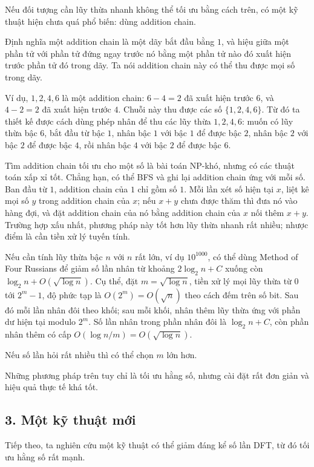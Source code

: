 \documentclass[11pt]{article}
\begin{document}
Nếu đối tượng cần lũy thừa nhanh không thể tối ưu bằng cách trên, có một kỹ
thuật hiện chưa quá phổ biến: dùng addition chain.

Định nghĩa một addition chain là một dãy bắt đầu bằng \(1\), và hiệu giữa một
phần tử với phần tử đứng ngay trước nó bằng một phần tử nào đó xuất hiện trước
phần tử đó trong dãy. Ta nói addition chain này có thể thu được mọi số trong
dãy.

Ví dụ, \(1,2,4,6\) là một addition chain: \(6-4=2\) đã xuất hiện trước \(6\),
và \(4-2=2\) đã xuất hiện trước \(4\). Chuỗi này thu được các số
\(\{1,2,4,6\}\). Từ đó ta thiết kế được cách dùng phép nhân để thu các lũy
thừa \(1,2,4,6\): muốn có lũy thừa bậc \(6\), bắt đầu từ bậc \(1\), nhân bậc
\(1\) với bậc \(1\) để được bậc \(2\), nhân bậc \(2\) với bậc \(2\) để được
bậc \(4\), rồi nhân bậc \(4\) với bậc \(2\) để được bậc \(6\).

Tìm addition chain tối ưu cho một số là bài toán NP-khó, nhưng có các thuật
toán xấp xỉ tốt. Chẳng hạn, có thể BFS và ghi lại addition chain ứng với mỗi
số. Ban đầu từ \(1\), addition chain của \(1\) chỉ gồm số \(1\). Mỗi lần xét
số hiện tại \(x\), liệt kê mọi số \(y\) trong addition chain của \(x\); nếu
\(x+y\) chưa được thăm thì đưa nó vào hàng đợi, và đặt addition chain của nó
bằng addition chain của \(x\) nối thêm \(x+y\). Trường hợp xấu nhất, phương
pháp này tốt hơn lũy thừa nhanh rất nhiều; nhược điểm là cần tiền xử lý tuyến
tính.

Nếu cần tính lũy thừa bậc \(n\) với \(n\) rất lớn, ví dụ \(10^{1000}\), có thể
dùng Method of Four Russians để giảm số lần nhân từ khoảng \(2\log_2 n+C\)
xuống còn \(\log_2 n+O(\sqrt{\log n})\). Cụ thể, đặt \(m=\sqrt{\log n}\), tiền
xử lý mọi lũy thừa từ \(0\) tới \(2^m-1\), độ phức tạp là
\(O(2^m)=O(\sqrt n)\) theo cách đếm trên số bit. Sau đó mỗi lần nhân đôi theo
khối; sau mỗi khối, nhân thêm lũy thừa ứng với phần dư hiện tại modulo \(2^m\).
Số lần nhân trong phần nhân đôi là \(\log_2 n+C\), còn phần nhân thêm có cấp
\(O(\log n/m)=O(\sqrt{\log n})\).

Nếu số lần hỏi rất nhiều thì có thể chọn \(m\) lớn hơn.

Những phương pháp trên tuy chỉ là tối ưu hằng số, nhưng cài đặt rất đơn giản
và hiệu quả thực tế khá tốt.

\subsection*{3. Một kỹ thuật mới}

Tiếp theo, ta nghiên cứu một kỹ thuật có thể giảm đáng kể số lần DFT, từ đó
tối ưu hằng số rất mạnh.
\end{document}
